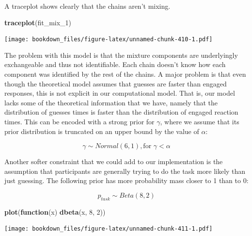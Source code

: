 \documentclass[12pt,]{krantz}
\newenvironment{Shaded}{\begin{snugshade}}{\end{snugshade}}
\newcommand{\ControlFlowTok}[1]{\textcolor[rgb]{0.13,0.29,0.53}{\textbf{#1}}}
\newcommand{\DecValTok}[1]{\textcolor[rgb]{0.00,0.00,0.81}{#1}}
\newcommand{\KeywordTok}[1]{\textcolor[rgb]{0.13,0.29,0.53}{\textbf{#1}}}
\newcommand{\NormalTok}[1]{#1}
\theoremstyle{definition}
\theoremstyle{definition}
\theoremstyle{definition}
\theoremstyle{remark}
\begin{document}
A traceplot shows clearly that the chains aren't mixing.

\begin{Shaded}
\begin{Highlighting}[]
\KeywordTok{traceplot}\NormalTok{(fit_mix_}\DecValTok{1}\NormalTok{) }
\end{Highlighting}
\end{Shaded}

\texttt{[image: bookdown\_files/figure-latex/unnamed-chunk-410-1.pdf]}

The problem with this model is that the mixture components are underlyingly exchangeable and thus not identifiable. Each chain doesn't know how each component was identified by the rest of the chains. A major problem is that even though the theoretical model assumes that guesses are faster than engaged responses, this is not explicit in our computational model. That is, our model lacks some of the theoretical information that we have, namely that the distribution of guesses times is faster than the distribution of engaged reaction times. This can be encoded with a strong prior for \(\gamma\), where we assume that its prior distribution is truncated on an upper bound by the value of \(\alpha\):

\begin{equation}
\gamma \sim Normal(6, 1), \text{for } \gamma < \alpha
\end{equation}

Another softer constraint that we could add to our implementation is the assumption that participants are generally trying to do the task more likely than just guessing. The following prior has more probability mass closer to 1 than to 0:

\begin{equation}
p_{task} \sim Beta(8, 2)
\end{equation}

\begin{Shaded}
\begin{Highlighting}[]
\KeywordTok{plot}\NormalTok{(}\ControlFlowTok{function}\NormalTok{(x) }\KeywordTok{dbeta}\NormalTok{(x, }\DecValTok{8}\NormalTok{, }\DecValTok{2}\NormalTok{))}
\end{Highlighting}
\end{Shaded}

\texttt{[image: bookdown\_files/figure-latex/unnamed-chunk-411-1.pdf]}
\end{document}
